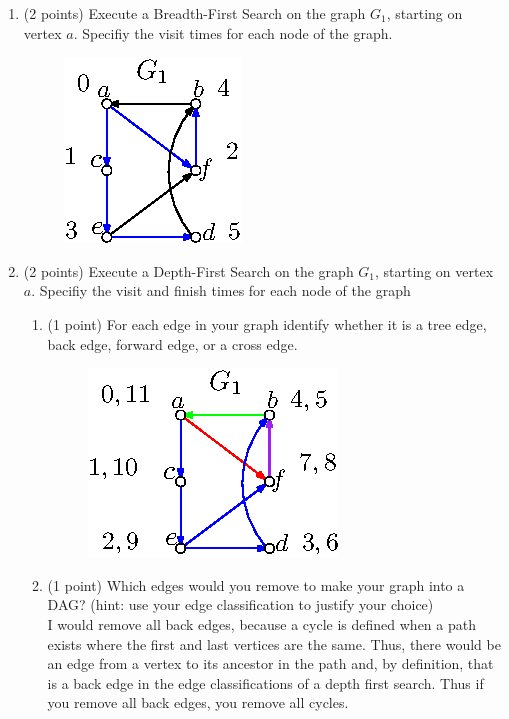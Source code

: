 \documentclass[12pt]{elsart}
\begin{document}
   \begin{enumerate}
      \item (2 points) Execute a Breadth-First Search on the graph $G_1$, starting on vertex $a$. Specifiy the visit times for each node of the graph.
          \begin{figure}[h]
            \centering \includegraphics[width=.45\textwidth]{Graph-02}
          \end{figure}
      \item (2 points) Execute a Depth-First Search on the graph $G_1$, starting on vertex $a$. Specifiy the visit and finish times for each node of the graph
   \begin{enumerate}
      \item (1 point) For each edge in your graph identify whether it is a tree edge, back edge, forward edge, or a cross edge.
          \begin{figure}[h]
            \centering \includegraphics[width=.45\textwidth]{Graph-03}
          \end{figure}
      \item (1 point) Which edges would you remove to make your graph into a DAG?  (hint: use your edge classification to justify your choice)\\
          I would remove all back edges, because a cycle is defined when a path exists where the first and last vertices are the same. Thus, there would be an edge from a vertex to its ancestor in the path and, by definition, that is a back edge in the edge classifications of a depth first search. Thus if you remove all back edges, you remove all cycles.
   \end{enumerate}

   \end{enumerate}
\end{document}

